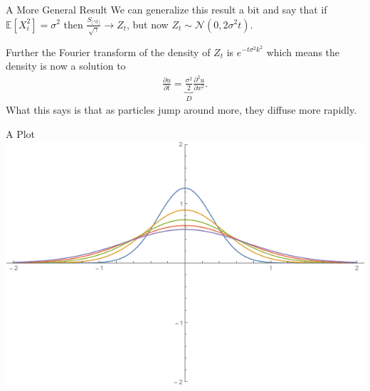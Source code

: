 \documentclass[pdf]{beamer}
\newcommand{\lra}{\longrightarrow}
\begin{document}
\begin{frame}{A More General Result}
    We can generalize this result a bit and say that if $ \mathbb{E}[X_i^2] = \sigma^2 $
    then $ \frac{S_{\lfloor \gamma t \rfloor}}{\sqrt{\gamma}} \lra Z_{t} $, but now $ Z_t \sim \mathcal{N}(0,2\sigma^2 t) $.
    
    Further the Fourier transform of the density of $ Z_t $ is $ e^{-t\sigma^2k^2} $
    which means the density is now a solution to
    \begin{align}
        \frac{\partial u}{\partial t} = \underbrace{\frac{\sigma^2}{2}}_{D}\frac{\partial^2 u}{\partial x^2}.
    \end{align}
    What this says is that as particles jump around more, they diffuse more rapidly.
\end{frame}


\begin{frame}{A Plot}
    \includegraphics[scale=0.4]{Diffusion}
\end{frame}
\end{document}

